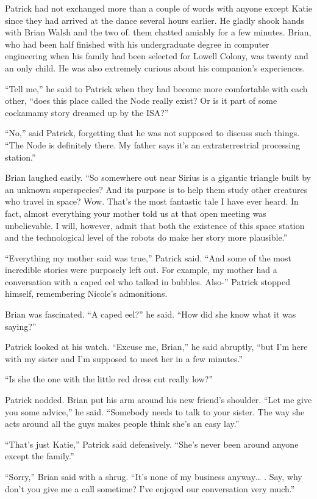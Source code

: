 \documentclass[]{article}
\begin{document}
{Patrick had not exchanged more than a couple of words with anyone except Katie since they had arrived at the dance several hours earlier. He gladly shook hands with Brian Walsh and the two of. them chatted amiably for a few minutes. Brian, who had been half finished with his undergraduate degree in computer engineering when his family had been selected for Lowell Colony, was twenty and an only child. He was also extremely curious about his companion’s experiences.

“Tell me,” he said to Patrick when they had become more comfortable with each other, “does this place called the Node really exist? Or is it part of some cockamamy story dreamed up by the ISA?”

“No,” said Patrick, forgetting that he was not supposed to discuss such things. “The Node is definitely there. My father says it’s an extraterrestrial processing station.”

Brian laughed easily. “So somewhere out near Sirius is a gigantic triangle built by an unknown superspecies? And its purpose is to help them study other creatures who travel in space? Wow. That’s the most fantastic tale I have ever heard. In fact, almost everything your mother told us at that open meeting was unbelievable. I will, however, admit that both the existence of this space station and the technological level of the robots do make her story more plausible.”

“Everything my mother said was true,” Patrick said. “And some of the most incredible stories were purposely left out. For example, my mother had a conversation with a caped eel who talked in bubbles. Also-” Patrick stopped himself, remembering Nicole’s admonitions.

Brian was fascinated. “A caped eel?” he said. “How did she know what it was saying?”

Patrick looked at his watch. “Excuse me, Brian,” he said abruptly, “but I’m here with my sister and I’m supposed to meet her in a few minutes.”

“Is she the one with the little red dress cut really low?”

Patrick nodded. Brian put his arm around his new friend’s shoulder. “Let me give you some advice,” he said. “Somebody needs to talk to your sister. The way she acts around all the guys makes people think she’s an easy lay.”

“That’s just Katie,” Patrick said defensively. “She’s never been around anyone except the family.”

“Sorry,” Brian said with a shrug. “It’s none of my business anyway… . Say, why don’t you give me a call sometime? I’ve enjoyed our conversation very much.”

}
\end{document}
